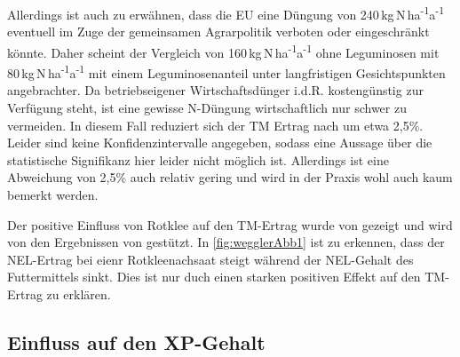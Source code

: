 Allerdings ist auch zu erwähnen, dass die \ac{EU} eine Düngung von 240\,kg\,N\,ha\textsuperscript{-1}a\textsuperscript{-1} eventuell im Zuge der gemeinsamen Agrarpolitik verboten oder eingeschränkt könnte.
Daher scheint der Vergleich von 160\,kg\,N\,ha\textsuperscript{-1}a\textsuperscript{-1} ohne Leguminosen mit 80\,kg\,N\,ha\textsuperscript{-1}a\textsuperscript{-1} mit einem Leguminosenanteil unter langfristigen Gesichtspunkten angebrachter.
Da betriebseigener Wirtschaftsdünger i.d.R. kostengünstig zur Verfügung steht, ist eine gewisse N-Düngung wirtschaftlich nur schwer zu vermeiden.
In diesem Fall reduziert sich der \ac{TM} Ertrag nach \textcite[11]{engel2013protein} um etwa 2,5\%.
Leider sind keine Konfidenzintervalle angegeben, sodass eine Aussage über die statistische Signifikanz hier leider nicht möglich ist.
Allerdings ist eine Abweichung von 2,5\% auch relativ gering und wird in der Praxis wohl auch kaum bemerkt werden.

Der positive Einfluss von Rotklee auf den \ac{TM}-Ertrag wurde von \textcite[242]{FrankowLindberg2009} gezeigt und wird von den Ergebnissen von \textcite[35]{weggler2050leguminosen} gestützt.
In \cref{fig:wegglerAbb1} ist zu erkennen, dass der \ac{NEL}-Ertrag bei eienr Rotkleenachsaat steigt während der \ac{NEL}-Gehalt des Futtermittels sinkt.
Dies ist nur duch einen starken positiven Effekt auf den \ac{TM}-Ertrag zu erklären.



\subsection{Einfluss auf den \acl{XP}-Gehalt}
\label{subsec:Protein}

